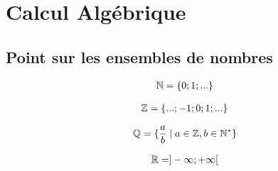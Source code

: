 \chapter{Calcul Algébrique}
\section{Point sur les ensembles de nombres}

\begin{definition}
	\begin{align*}
		\mathbb{N} = \{0; 1; ...\}
	\end{align*}
\end{definition}

\begin{definition}
	\begin{align*}
		\mathbb{Z} = \{...; -1; 0; 1; ...\}
	\end{align*}
\end{definition}

\begin{definition}
	\begin{align*}
		\mathbb{Q} = \{\frac{a}{b} \mid a \in \mathbb{Z}, b \in \mathbb{N}^* \}
	\end{align*}
\end{definition}

\begin{definition}
	\begin{align*}
		\mathbb{R} = ]-\infty; +\infty[
	\end{align*}
\end{definition}

